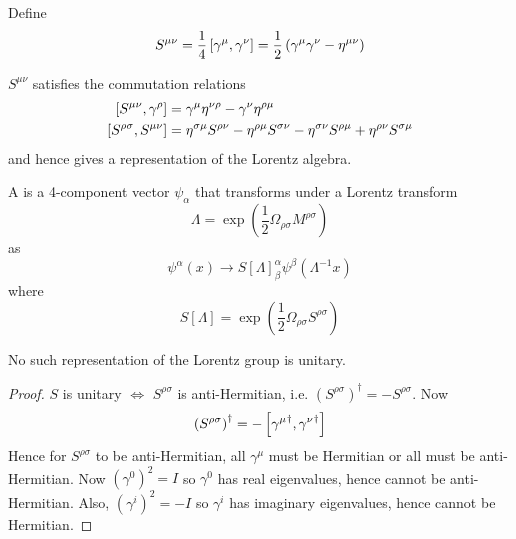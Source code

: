 \documentclass{article}
\begin{document}
\begin{definition}[$S^{\mu\nu}$]
Define
\[
S^{\mu\nu}=\frac{1}{4}\comm[\gamma^\mu]{\gamma^\nu}=\frac{1}{2}\left( \gamma^\mu \gamma^\nu -\eta^{\mu\nu} \right)
\]
\end{definition}

\begin{theorem}
$S^{\mu\nu}$ satisfies the commutation relations
\begin{align*}
\comm[S^{\mu\nu}]{\gamma^\rho} &= \gamma^\mu \eta^{\nu\rho}-\gamma^\nu \eta^{\rho\mu} \\
\comm[S^{\rho\sigma}]{S^{\mu\nu}} &= \eta^{\sigma\mu}S^{\rho\nu}-\eta^{\rho\mu}S^{\sigma\nu}-\eta^{\sigma\nu}S^{\rho\mu}+\eta^{\rho\nu}S^{\sigma\mu}
\end{align*}
and hence gives a representation of the Lorentz algebra.
\end{theorem}

\begin{definition}[Spinor]
A  is a 4-component vector $\psi_\alpha$ that transforms under a Lorentz transform 
\[
\Lambda=\exp\left(\frac{1}{2}\Omega_{\rho\sigma}M^{\rho\sigma}\right)
\]
as 
\[
\psi^{\alpha}(x)\to S[\Lambda]_{\beta}^{\alpha}\psi^{\beta}\left(\Lambda^{-1}x\right)
\]
where
\[
S[\Lambda]=\exp\left(\frac{1}{2}\Omega_{\rho\sigma}S^{\rho\sigma}\right)
\]
\end{definition}

\begin{theorem}
No such representation of the Lorentz group is unitary.
\end{theorem}
\begin{proof}
$S$ is unitary $\iff$ $S^{\rho\sigma}$ is anti-Hermitian, i.e. $\left( S^{\rho\sigma} \right)^\dagger = -S^{\rho\sigma}$. Now 
\[
\left( S^{\rho\sigma} \right)^\dagger = -\comm[{\gamma^\mu}^\dagger]{{\gamma^\nu}^\dagger}
\]
Hence for $S^{\rho\sigma}$ to be anti-Hermitian, all $\gamma^\mu$ must be Hermitian or all must be anti-Hermitian. Now $(\gamma^0)^2=I$ so $\gamma^0$ has real eigenvalues, hence cannot be anti-Hermitian. Also, $(\gamma^i)^2=-I$ so $\gamma^i$ has imaginary eigenvalues, hence cannot be Hermitian. 
\end{proof}
\end{document}
